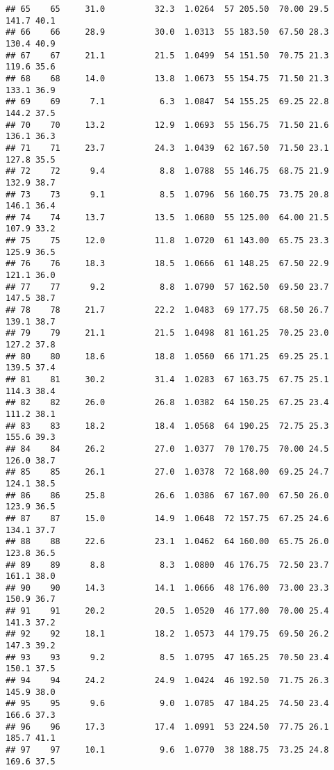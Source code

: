 \documentclass[
]{book}
\theoremstyle{definition}
\theoremstyle{definition}
\theoremstyle{definition}
\theoremstyle{definition}
\theoremstyle{remark}
\begin{document}
\begin{verbatim}
## 65    65     31.0          32.3  1.0264  57 205.50  70.00 29.5    141.7 40.1
## 66    66     28.9          30.0  1.0313  55 183.50  67.50 28.3    130.4 40.9
## 67    67     21.1          21.5  1.0499  54 151.50  70.75 21.3    119.6 35.6
## 68    68     14.0          13.8  1.0673  55 154.75  71.50 21.3    133.1 36.9
## 69    69      7.1           6.3  1.0847  54 155.25  69.25 22.8    144.2 37.5
## 70    70     13.2          12.9  1.0693  55 156.75  71.50 21.6    136.1 36.3
## 71    71     23.7          24.3  1.0439  62 167.50  71.50 23.1    127.8 35.5
## 72    72      9.4           8.8  1.0788  55 146.75  68.75 21.9    132.9 38.7
## 73    73      9.1           8.5  1.0796  56 160.75  73.75 20.8    146.1 36.4
## 74    74     13.7          13.5  1.0680  55 125.00  64.00 21.5    107.9 33.2
## 75    75     12.0          11.8  1.0720  61 143.00  65.75 23.3    125.9 36.5
## 76    76     18.3          18.5  1.0666  61 148.25  67.50 22.9    121.1 36.0
## 77    77      9.2           8.8  1.0790  57 162.50  69.50 23.7    147.5 38.7
## 78    78     21.7          22.2  1.0483  69 177.75  68.50 26.7    139.1 38.7
## 79    79     21.1          21.5  1.0498  81 161.25  70.25 23.0    127.2 37.8
## 80    80     18.6          18.8  1.0560  66 171.25  69.25 25.1    139.5 37.4
## 81    81     30.2          31.4  1.0283  67 163.75  67.75 25.1    114.3 38.4
## 82    82     26.0          26.8  1.0382  64 150.25  67.25 23.4    111.2 38.1
## 83    83     18.2          18.4  1.0568  64 190.25  72.75 25.3    155.6 39.3
## 84    84     26.2          27.0  1.0377  70 170.75  70.00 24.5    126.0 38.7
## 85    85     26.1          27.0  1.0378  72 168.00  69.25 24.7    124.1 38.5
## 86    86     25.8          26.6  1.0386  67 167.00  67.50 26.0    123.9 36.5
## 87    87     15.0          14.9  1.0648  72 157.75  67.25 24.6    134.1 37.7
## 88    88     22.6          23.1  1.0462  64 160.00  65.75 26.0    123.8 36.5
## 89    89      8.8           8.3  1.0800  46 176.75  72.50 23.7    161.1 38.0
## 90    90     14.3          14.1  1.0666  48 176.00  73.00 23.3    150.9 36.7
## 91    91     20.2          20.5  1.0520  46 177.00  70.00 25.4    141.3 37.2
## 92    92     18.1          18.2  1.0573  44 179.75  69.50 26.2    147.3 39.2
## 93    93      9.2           8.5  1.0795  47 165.25  70.50 23.4    150.1 37.5
## 94    94     24.2          24.9  1.0424  46 192.50  71.75 26.3    145.9 38.0
## 95    95      9.6           9.0  1.0785  47 184.25  74.50 23.4    166.6 37.3
## 96    96     17.3          17.4  1.0991  53 224.50  77.75 26.1    185.7 41.1
## 97    97     10.1           9.6  1.0770  38 188.75  73.25 24.8    169.6 37.5

\end{verbatim}
\end{document}

